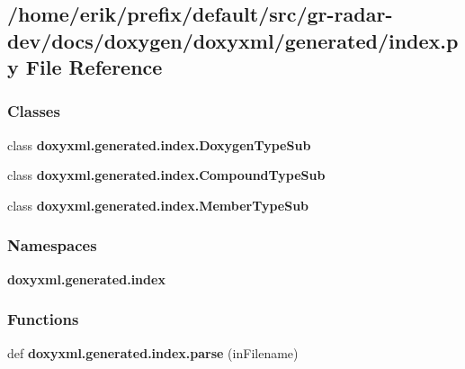 \subsection{/home/erik/prefix/default/src/gr-\/radar-\/dev/docs/doxygen/doxyxml/generated/index.py File Reference}
\label{index_8py}
\subsubsection*{Classes}
\begin{DoxyCompactItemize}
\item 
class {\bf doxyxml.\+generated.\+index.\+Doxygen\+Type\+Sub}
\item 
class {\bf doxyxml.\+generated.\+index.\+Compound\+Type\+Sub}
\item 
class {\bf doxyxml.\+generated.\+index.\+Member\+Type\+Sub}
\end{DoxyCompactItemize}
\subsubsection*{Namespaces}
\begin{DoxyCompactItemize}
\item 
 {\bf doxyxml.\+generated.\+index}
\end{DoxyCompactItemize}
\subsubsection*{Functions}
\begin{DoxyCompactItemize}
\item 
def {\bf doxyxml.\+generated.\+index.\+parse} (in\+Filename)
\end{DoxyCompactItemize}
